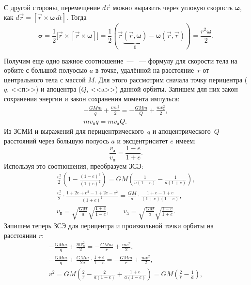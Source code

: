 С другой стороны, перемещение $d\vec{r}$ можно выразить через угловую скорость $\boldsymbol{\omega}$, как $d \vec{r} = [\vec{r} \times \boldsymbol{\omega} \,d t]$. Тогда
\begin{equation*}
    \boldsymbol{\sigma}
    = \frac{1}{2} \big[ \vec{r} \times [\vec{r} \times \boldsymbol{\omega} ]\big]
    = \frac{1}{2} \left(\vec{r} \underbrace{(\vec{r}, \boldsymbol{\omega})}_0 - \boldsymbol{\omega} ( \vec{r}, \vec{r} ) \right)
    = \frac{r^2 \boldsymbol{\omega}}{2}.
\end{equation*}

Получим еще одно важное соотношение~--- ~--- формулу для скорости тела на орбите с большой полуосью $a$ в точке, удалённой на расстояние~$r$ от центрального тела с массой $M$. Для этого рассмотрим  сначала точку перицентра ($q$, <<п>>) и апоцентра ($Q$, <<a>>) данной орбиты. Запишем для них закон сохранения энергии и закон сохранения момента импульса:
\begin{gather*}
    -\frac{GMm}{q} + \frac{m v^2_\text{п}}{2} = -\frac{GMm}{Q} + \frac{m v^2_\text{а}}{2},\\
    mv_\text{п}q = mv_\text{a}Q.
\end{gather*}
Из ЗСМИ и выражений для перицентрического~$q$ и апоцентрического~$Q$ расстояний через большую полуось $a$ и эксцентриситет $e$ имеем:
\begin{equation*}
    \frac{v_\text{а}}{v_\text{п}} = \frac{1 - e}{1 + e}.
\end{equation*}
Используя это соотношения, преобразуем ЗСЭ:
\begin{gather}
    \frac{v_\text{п}^2}{2} \left( 1 - \frac{(1 -e)^2}{(1 + e)^2} \right) = GM \left( \frac{1}{a(1-e)} - \frac{1}{a(1+e)} \right),\\
    \frac{v_\text{п}^2}{2} \cdot \frac{ 1 + 2e + e^2 - 1 + 2e - e^2}{(1+e)^2} = \frac{GM}{a} \cdot \frac{1 + e - 1 +  e}{(1+e)(1-e)},\\
    v_\text{п} = \sqrt{\frac{GM}{a}}\sqrt{\frac{1+e}{1-e}}, \quad \quad v_\text{a} = \sqrt{\frac{GM}{a}}\sqrt{\frac{1-e}{1+e}}.
\end{gather}
Запишем теперь ЗСЭ для перицентра и произвольной точки орбиты на расстоянии $r$:
\begin{gather*}
    -\frac{GMm}{q} + \frac{m v^2_\text{п}}{2} = -\frac{GMm}{r} + \frac{m v^2}{2},\\
    -\frac{GMm}{q} + \frac{GMm}{2a} \cdot \frac{1+e}{1-e} = -\frac{GMm}{r} + \frac{m v^2}{2},\\
    v^2 = GM \left( \frac{2}{r} - \frac{2}{a(1 - e)} + \frac{1+e}{a (1-e) }\right) = GM \left( \frac{2}{r} - \frac{1}{a} \right),
\end{gather*}
